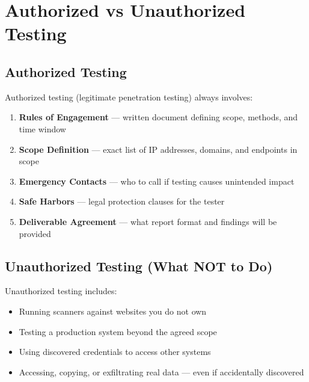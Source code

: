 \section{Authorized vs Unauthorized Testing}


\subsection{Authorized Testing}

Authorized testing (legitimate penetration testing) always involves:

\begin{enumerate}[leftmargin=*]
  \item \textbf{Rules of Engagement} --- written document defining scope, methods, and time window
  \item \textbf{Scope Definition} --- exact list of IP addresses, domains, and endpoints in scope
  \item \textbf{Emergency Contacts} --- who to call if testing causes unintended impact
  \item \textbf{Safe Harbors} --- legal protection clauses for the tester
  \item \textbf{Deliverable Agreement} --- what report format and findings will be provided
\end{enumerate}

\subsection{Unauthorized Testing (What NOT to Do)}

Unauthorized testing includes:

\begin{itemize}[leftmargin=*]
  \item Running scanners against websites you do not own
  \item Testing a production system beyond the agreed scope
  \item Using discovered credentials to access other systems
  \item Accessing, copying, or exfiltrating real data --- even if accidentally discovered
\end{itemize}

